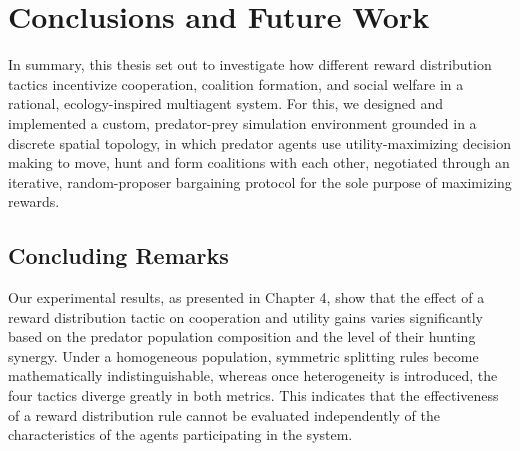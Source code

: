 \documentclass[12pt,a4paper]{report}
\begin{document}
	\chapter{Conclusions and Future Work}
	\label{ch:conclusion}
	
	In summary, this thesis set out to investigate how different reward distribution tactics incentivize cooperation, coalition formation, and social welfare in a rational, ecology-inspired multiagent system. For this, we designed and implemented a custom, predator-prey simulation environment grounded in a discrete spatial topology, in which predator agents use utility-maximizing decision making to move, hunt and form coalitions with each other, negotiated through an iterative, random-proposer bargaining protocol for the sole purpose of maximizing rewards. \\

	\section{Concluding Remarks}

	Our experimental results, as presented in Chapter 4, show that the effect of a reward distribution tactic on cooperation and utility gains varies significantly based on the predator population composition and the level of their hunting synergy. Under a homogeneous population, symmetric splitting rules become mathematically indistinguishable, whereas once heterogeneity is introduced, the four tactics diverge greatly in both metrics. This indicates that the effectiveness of a reward distribution rule cannot be evaluated independently of the characteristics of the agents participating in the system. \\
	
\end{document}
